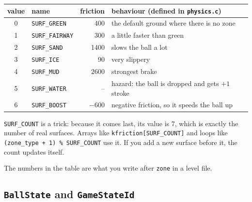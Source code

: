 \documentclass[11pt,a4paper]{article}
\newcommand{\code}[3]{}
\begin{document}
\begin{center}
\begin{tabular}{@{}clrl@{}}
\toprule
value & name & friction & behaviour (defined in \texttt{physics.c}) \\
\midrule
0 & \texttt{SURF\_GREEN}   & 400   & the default ground where there is no zone \\
1 & \texttt{SURF\_FAIRWAY} & 300   & a little faster than green \\
2 & \texttt{SURF\_SAND}    & 1400  & slows the ball a lot \\
3 & \texttt{SURF\_ICE}     & 90    & very slippery \\
4 & \texttt{SURF\_MUD}     & 2600  & strongest brake \\
5 & \texttt{SURF\_WATER}   & --    & hazard: the ball is dropped and gets $+1$ stroke \\
6 & \texttt{SURF\_BOOST}   & $-600$ & negative friction, so it speeds the ball up \\
\bottomrule
\end{tabular}
\end{center}

\begin{description}
  \item[Line 22.] \texttt{SURF\_COUNT} is a trick: because it comes last, its value is 7, which is exactly the
  number of real surfaces. Arrays like \texttt{kfriction[SURF\_COUNT]} and loops like
  \texttt{(zone\_type + 1) \% SURF\_COUNT} use it. If you add a new surface before it, the count updates itself.
  \item The numbers in the table are what you write after \texttt{zone} in a level file.
\end{description}

\subsection{\texttt{BallState} and \texttt{GameStateId}}

\code{types.h}{27}{46}
\end{document}
